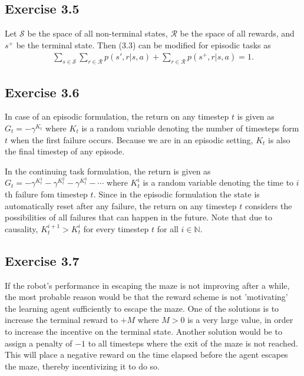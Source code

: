 \documentclass[10pt]{article}
\begin{document}
	\subsection*{Exercise 3.5}
	\label{ss:3.5}
	Let $\mathcal{S}$ be the space of all non-terminal states, $\mathcal{R}$ be the space of all rewards, and $s^+$ be the terminal state. Then (3.3) can be modified for episodic tasks as
	\begin{align*}
	\sum_{s\in\mathcal{S}} \sum_{r\in\mathcal{R}} p(s',r | s,a) + \sum_{r\in\mathcal{R}} p(s^+,r | s,a) = 1.
	\end{align*}
	\subsection*{Exercise 3.6}
	\label{ss:3.6}
	In case of an episodic formulation, the return on any timestep $t$ is given as $G_t = -\gamma^{K_t}$ where $K_t$ is a random variable denoting the number of timesteps form $t$ when the first failure occurs. Because we are in an episodic setting, $K_t$ is also the final timestep of any episode.\par\noindent
	In the continuing task formulation, the return is given as $G_t = -\gamma^{K^1_t} - \gamma^{K^2_t} - \gamma^{K^3_t} - \cdots$ where $K^i_t$ is a random variable denoting the time to $i$th failure fom timestep $t$. Since in the episodic formulation the state is automatically reset after any failure, the return on any timestep $t$ considers the possibilities of all failures that can happen in the future. Note that due to causality, $K^{i+1}_t > K^i_t$ for every timestep $t$ for all $i\in\mathbb{N}$.
	\subsection*{Exercise 3.7}
	\label{ss:3.7}
	If the robot's performance in escaping the maze is not improving after a while, the most probable reason would be that the reward scheme is not 'motivating' the learning agent sufficiently to escape the maze. One of the solutions is to increase the terminal reward to $+M$ where $M>0$ is a very large value, in order to increase the incentive on the terminal state. Another solution would be to assign a penalty of $-1$ to all timesteps where the exit of the maze is not reached. This will place a negative reward on the time elapsed before the agent escapes the maze, thereby incentivizing it to do so.
\end{document}
